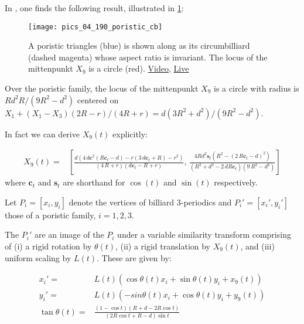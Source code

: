 In \cite[page 17]{odehnal2011-poristic}, one finds the following result, illustrated in \cref{fig:04-poristic-x9}:

\begin{figure}
    \centering
    \texttt{[image: pics\_04\_190\_poristic\_cb]}
    \caption{A poristic triangles (blue) is shown along as its circumbilliard (dashed magenta) whose aspect ratio is invariant. The locus of the mittenpunkt $X_9$ is a circle (red). \href{https://youtu.be/LGgh11LMGGY}{Video}, \href{https://bit.ly/3tcGtOj}{Live}}
    \label{fig:04-poristic-x9}
\end{figure}

\begin{lemma}
Over the poristic family, the locus of the mittenpunkt $X_9$ is a circle with radius is $R{d^2}R/(9R^2-d^2)$ centered on $X_1 + (X_1 - X_3) (2 R - r)/(4 R + r)=d (3 R^2+d^2)/(9R^2-d^2)$. 
\end{lemma}

In fact we can derive $X_9(t)$ explicitly:

\begin{lemma}
{\small
\begin{align}
    X_9(t)= &\left[  \frac {d \left( 4\, d \mathbf{c}^2   
 \left( R\mathbf{c}_t-d \right) -r \left( 3\,d\mathbf{c}_t  +R \right) -{r}^{2} \right) }{ \left( 4\,R+r \right) 
 \left(d \mathbf{c}_t  -R+r \right) }
  , \, \frac {4R{d}^{2}\mathbf{s}_t  \left( R^2- \left( 2\,R\mathbf{c}_t-d \right) ^{2}  \right) }{ \left( {R}^{2}+{d
}^{2}-2\,dR\mathbf{c}_t  \right)  \left( 9\,{R}^{2}-{d}^{2}
 \right) }
    \right]
\label{eq:04-x9-poristic}
\end{align}
where $\mathbf{c}_t$ and $\mathbf{s}_t$ are shorthand for $\cos(t)$ and $\sin(t)$ respectively.
}
\end{lemma}

Let $P_i=[x_i,y_i]$ denote the vertices of billiard 3-periodics and $P_i'=[x_i',y_i']$ those of a poristic family, $i=1,2,3$.

\begin{theorem}
The $P_i'$ are an image of the $P_i$ under a variable similarity transform comprising of (i) a rigid rotation by $\theta(t)$, (ii) a rigid translation by $X_9(t)$, and (iii)  uniform scaling by $L(t)$. These are given by: 

\begin{align*}
    x_i'=&L(t)(\cos \theta(t) x_i+\sin\theta(t) y_i+x_9(t) )\\
    y_i'=&L(t)(-sin\theta(t) x_i+\cos\theta(t) y_i+y_9(t))\\
    \tan\theta(t)=& \frac{(1-\cos t)(R+d-2R\cos t)}{(2R\cos t+R-d)\sin t}
\end{align*}
\label{thm:similarity}
\end{theorem}

